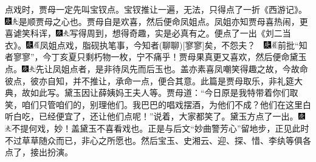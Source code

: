 点戏时，贾母一定先叫宝钗点。宝钗推让一遍，无法，只得点了一折《西游记》。{\includegraphics[width=3mm]{../Images/00004}\includegraphics[width=3mm]{../Images/00012}\footnotesize \kaishu 是顺贾母之心也。}贾母自是欢喜，然后便命凤姐点。凤姐亦知贾母喜热闹，更喜谑笑科诨，{\includegraphics[width=3mm]{../Images/00004}\includegraphics[width=3mm]{../Images/00012}\footnotesize \kaishu 写得周到，想得奇趣，实是必真有之。}便点了一出《刘二当衣》。{{\includegraphics[width=3mm]{../Images/00004}\includegraphics[width=3mm]{../Images/00010}\footnotesize \kaishu 凤姐点戏，脂砚执笔事，今知者{(聊聊)}{[}寥寥{]}矣，不怨夫？　\includegraphics[width=3mm]{../Images/00004}\includegraphics[width=3mm]{../Images/00010}\footnotesize \kaishu 前批“知者寥寥”，今丁亥夏只剩朽物一枚，宁不痛乎！}}贾母果真更又喜欢，然后便命黛玉点。{\includegraphics[width=3mm]{../Images/00004}\includegraphics[width=3mm]{../Images/00012}\footnotesize \kaishu 先让凤姐点者，是非待凤先而后玉也。盖亦素喜凤嘲笑得趣之故，今故命彼点，彼亦自知，并不推让，承命一点，便合其意。此篇是贾母取乐，非礼筵大典，故如此写。}黛玉因让薛姨妈王夫人等。贾母道：“今日原是我特带着你们取笑，咱们只管咱们的，别理他们。我巴巴的唱戏摆酒，为他们不成？他们在这里白听白吃，已经便宜了，还让他们点呢！”说着，大家都笑了。黛玉方点了一出。{\includegraphics[width=3mm]{../Images/00004}\includegraphics[width=3mm]{../Images/00012}\footnotesize \kaishu 不提何戏，妙！盖黛玉不喜看戏也。正是与后文“妙曲警芳心”留地步，正见此时不过草草随众而已，非心之所愿也。}然后宝玉、史湘云、迎、探、惜、李纨等俱各点了，接出扮演。

